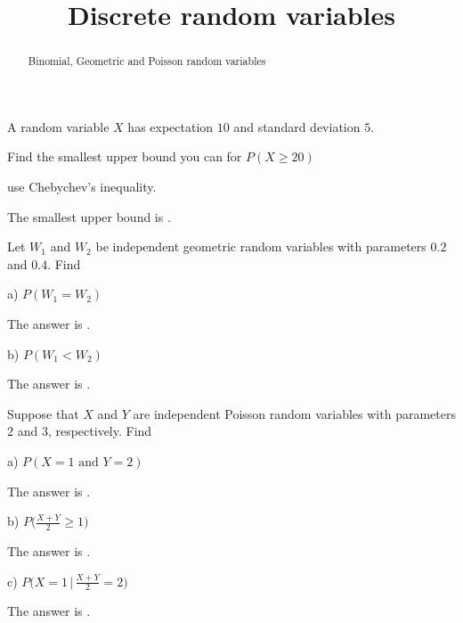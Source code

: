 \documentclass{ximera}
\title{Discrete random variables}
\begin{document}
\begin{abstract}
Binomial, Geometric and Poisson random variables
\end{abstract}
\maketitle

A random variable $X$ has expectation $10$ and standard deviation $5$.

\begin{question} 
Find the smallest upper bound you can for $P(X\geq 20)$
     \begin{hint}
          use Chebychev's inequality.
     \end{hint}
     \begin{solution}
          The smallest upper bound is .
     \end{solution}
\end{question}

Let $W_{1}$ and $W_{2}$ be independent geometric random variables with parameters $0.2$ and $0.4$. Find

\begin{question}
a) $P(W_{1}=W_{2})$
     \begin{solution}
          The answer is .
     \end{solution}
\end{question}

\begin{question}
b) $P(W_{1} < W_{2})$
     \begin{solution}
          The answer is .
     \end{solution}
\end{question}

Suppose that $X$ and $Y$ are independent Poisson random variables with parameters $2$ and $3$, respectively. Find

\begin{question}
a) $P(X=1 \text{ and } Y=2)$
     \begin{solution}
          The answer is .
     \end{solution}
\end{question}

\begin{question}
b) $P\bigg( \frac{X + Y}{2} \geq 1 \bigg)$
     \begin{solution}
          The answer is .
     \end{solution}
\end{question}

\begin{question}
c) $P\bigg( X=1 \,\bigg\vert\, \frac{X + Y}{2} = 2  \bigg)$
     \begin{solution}
          The answer is .
     \end{solution}
\end{question}
\end{document}
